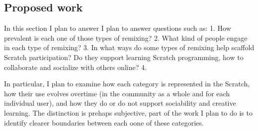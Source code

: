 \subsection{Proposed work}
In this section I plan to answer
I plan to answer questions such as:
1. How prevalent is each one of those types of remixing?
2. What kind of people engage in each type of remixing?
3. In what ways do some types of remixing help scaffold Scratch participation? Do they support learning Scratch programming, how to collaborate and socialize with others online?
4. 

In particular, I plan to examine how each category is represented in the Scratch, how their use evolves overtime (in the community as a whole and for each individual user), and how they do or do not support sociability and creative learning.
The distinction is prehaps subjective, part of the work I plan to do is to identify clearer boundaries between each oone of these categories.

